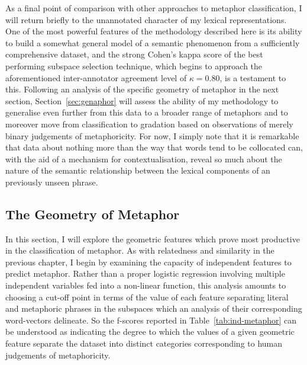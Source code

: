 As a final point of comparison with other approaches to metaphor classification, I will return briefly to the unannotated character of my lexical representations.  One of the most powerful features of the methodology described here is its ability to build a somewhat general model of a semantic phenomenon from a sufficiently comprehensive dataset, and the strong Cohen's kappa score of the best performing subspace selection technique, which begins to approach the aforementioned inter-annotator agreement level of $\kappa = 0.80$, is a testament to this.  Following an analysis of the specific geometry of metaphor in the next section, Section~\ref{sec:genaphor} will assess the ability of my methodology to generalise even further from this data to a broader range of metaphors and to moreover move from classification to gradation based on observations of merely binary judgements of metaphoricity.  For now, I simply note that it is remarkable that data about nothing more than the way that words tend to be collocated can, with the aid of a mechanism for contextualisation, reveal so much about the nature of the semantic relationship between the lexical components of an previously unseen phrase.

\subsection{The Geometry of Metaphor}
In this section, I will explore the geometric features which prove most productive in the classification of metaphor.  As with relatedness and similarity in the previous chapter, I begin by examining the capacity of independent features to predict metaphor.  Rather than a proper logistic regression involving multiple independent variables fed into a non-linear function, this analysis amounts to choosing a cut-off point in terms of the value of each feature separating literal and metaphoric phrases in the subspaces which an analysis of their corresponding word-vectors delineate.  So the f-scores reported in Table~\ref{tab:ind-metaphor} can be understood as indicating the degree to which the values of a given geometric feature separate the dataset into distinct categories corresponding to human judgements of metaphoricity.

